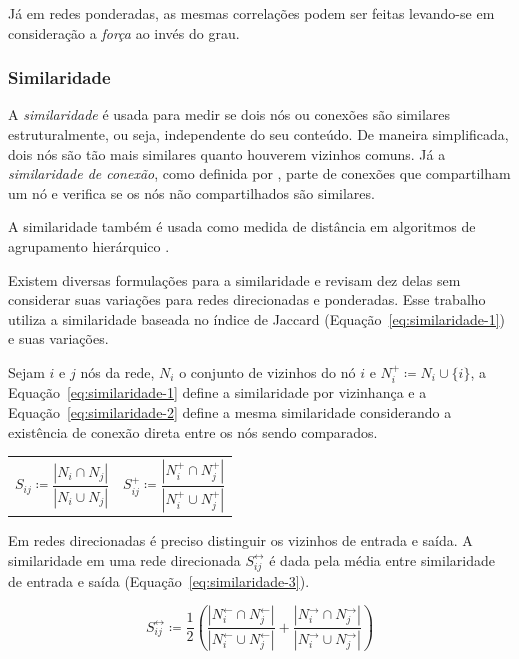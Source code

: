 \documentclass[12pt,a4paper,final]{article}
\newcommand{\defn}{\coloneqq} %
\newcommand{\linkin}[1]{#1^\leftarrow} %
\newcommand{\linkout}[1]{#1^\rightarrow} %
\newcommand{\linkboth}[1]{#1^\leftrightarrow} %
\begin{document}
Já em redes ponderadas, as mesmas correlações podem ser feitas levando-se em consideração a \textit{força} ao invés do grau.

\subsubsection{Similaridade}

A \textit{similaridade} é usada para medir se dois nós ou conexões são similares estruturalmente, ou seja, independente do seu conteúdo. De maneira simplificada, dois nós são tão mais similares quanto houverem vizinhos comuns. Já a \textit{similaridade de conexão}, como definida por , parte de conexões que compartilham um nó e verifica se os nós não compartilhados são similares.

A similaridade também é usada como medida de distância em algoritmos de agrupamento hierárquico \cite{Barabasi2016-rn}.

Existem diversas formulações para a similaridade e  revisam dez delas sem considerar suas variações para redes direcionadas e ponderadas. Esse trabalho utiliza a similaridade baseada no índice de Jaccard (Equação~\ref{eq:similaridade-1}) e suas variações.

Sejam $i$ e $j$ nós da rede, $N_i$ o conjunto de vizinhos do nó $i$ e $N_i^+ \defn N_i \cup \{i\}$, a Equação~\ref{eq:similaridade-1} define a similaridade por vizinhança e a Equação~\ref{eq:similaridade-2} define a mesma similaridade considerando a existência de conexão direta entre os nós sendo comparados.

\noindent
\begin{tabularx}{\linewidth}{@{}XX@{}}
    \begin{equation} \label{eq:similaridade-1}
        S_{ij} \defn \frac{|N_i \cap N_j|}{|N_i \cup N_j|} 
    \end{equation} &
    \begin{equation} \label{eq:similaridade-2}
        S_{ij}^+ \defn \frac{|N_i^+ \cap N_j^+|}{|N_i^+ \cup N_j^+|} 
    \end{equation}
\end{tabularx}

Em redes direcionadas é preciso distinguir os vizinhos de entrada e saída. A similaridade em uma rede direcionada $\linkboth{S}_{ij}$ é dada pela média entre similaridade de entrada e saída (Equação~\ref{eq:similaridade-3}).

\begin{equation} \label{eq:similaridade-3}
    \linkboth{S}_{ij} \defn \frac{1}{2} \left( \frac{|\linkin{N}_i \cap \linkin{N}_j|}{|\linkin{N}_i \cup \linkin{N}_j|} + \frac{|\linkout{N}_i \cap \linkout{N}_j|}{|\linkout{N}_i \cup \linkout{N}_j|} \right)
\end{equation}
\end{document}
